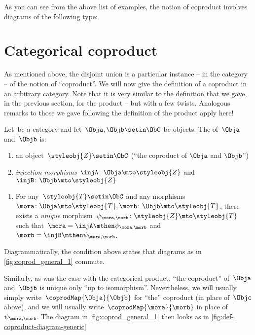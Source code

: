 As you can see from the above list of examples, the notion of coproduct involves diagrams of the following type:


\section{Categorical coproduct}

As mentioned above, the disjoint union is a particular instance -- in the category \Set  -- of the notion of ``coproduct''.
We will now give the definition of a coproduct in an arbitrary category.
Note that it is very similar to the definition that we gave, in the previous section, for the product -- but with a few twists.
Analogous remarks to those we gave following the definition of the product apply here!

\begin{ctdefinition}
    \label{def:catcoproduct}
    Let~\CatC be a category and let~$\Obja, \Objb \setin \ObC$ be objects.
    The \emph{} of~$\Obja$ and~$\Objb$ is: \\
    \constit
    \begin{enumerate}
        \item an object~$\styleobj{Z} \setin \ObC$ (``the coproduct of $\Obja$ and $\Objb$'')
        \item \emph{injection morphisms}~$\injA \colon \Obja \mto \styleobj{Z} $ and~$\injB \colon \Objb \mto \styleobj{Z} $
    \end{enumerate}
    \condit
    \begin{enumerate}
        \item For any~$\styleobj{T} \setin \ObC$ and any morphisms~$\mora \colon  \Obja \mto \styleobj{T}, \morb \colon \Objb \mto \styleobj{T}$, there exists a \emph{unique} morphism~$\psi_{\mora, \morb} \colon \styleobj{Z} \mto \styleobj{T}$ such that~$\mora = \injA\mthen \psi_{\mora, \morb}$ and~$\morb = \injB \mthen \psi_{\mora,\morb}$.
    \end{enumerate}
\end{ctdefinition}

\begin{remark}
    Diagrammatically, the condition above states that diagrams as in \cref{fig:coprod_general_1} commute.
    \begin{marginfigure}
        \centering
        \caption{}
        \label{fig:coprod_general_1}
        \label{fig:def-coproduct-diagram}
    \end{marginfigure}
    Similarly, as was the case with the categorical product, ``the coproduct'' of~$\Obja$ and~$\Objb$ is unique only ``up to isomorphism''.
    Nevertheless, we will usually simply write~$\coprodMap{\Obja}{\Objb}$ for ``the'' coproduct (in place of~$\Objc$ above), and we will usually write~$\coprodMap{\mora}{\morb}$ in place of~$\psi_{\mora, \morb}$.
    The diagram in \cref{fig:coprod_general_1} then looks as in \cref{fig:def-coproduct-diagram-generic}
\end{remark}

